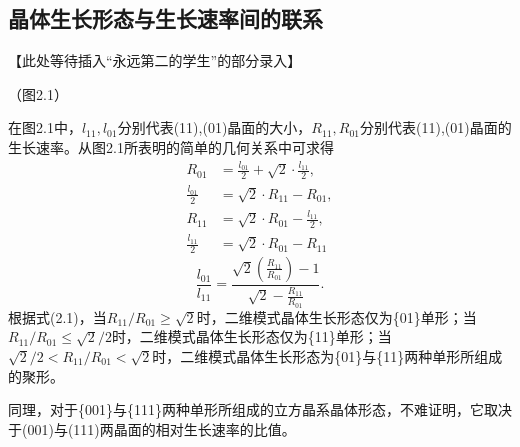 \subsection{晶体生长形态与生长速率间的联系}

【此处等待插入“永远第二的学生”的部分录入】

（图2.1）

在图2.1中，$l_{11},l_{01}$分别代表(11),(01)晶面的大小，$R_{11},R_{01}$分别代表(11),(01)晶面的生长速率。从图2.1所表明的简单的几何关系中可求得
\begin{align*}
R_{01}&=\frac{l_{01}}{2}+\sqrt{2}\cdot\frac{l_{11}}{2},\\
\frac{l_{01}}{2}&=\sqrt{2}\cdot R_{11}-R_{01},\\
R_{11}&=\sqrt{2}\cdot R_{01}-\frac{l_{11}}{2},\\
\frac{l_{11}}{2}&=\sqrt{2}\cdot R_{01}-R_{11}
\end{align*}
\begin{equation}
\frac{l_{01}}{l_{11}}=\frac{\displaystyle\sqrt{2}\left(\frac{R_{11}}{R_{01}}\right)-1}{\displaystyle\sqrt{2}-\frac{R_{11}}{R_{01}}}.
\end{equation}
根据式(2.1)，当$R_{11}/R_{01}\geq\sqrt{2}$时，二维模式晶体生长形态仅为\{01\}单形；当$R_{11}/R_{01}\leq\sqrt{2}/2$时，二维模式晶体生长形态仅为\{11\}单形；当$\sqrt{2}/2<R_{11}/R_{01}<\sqrt{2}$时，二维模式晶体生长形态为\{01\}与\{11\}两种单形所组成的聚形。

同理，对于\{001\}与\{111\}两种单形所组成的立方晶系晶体形态，不难证明，它取决于(001)与(111)两晶面的相对生长速率的比值。